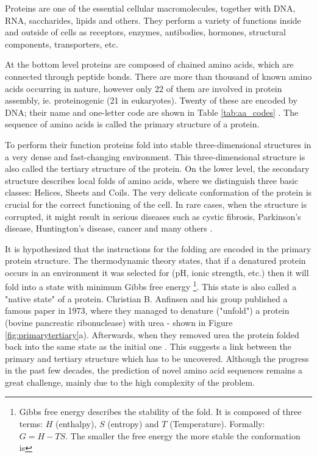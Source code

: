 Proteins are one of the essential cellular macromolecules, together with DNA, RNA, saccharides, lipids and others.
They perform a variety of functions inside and outside of cells as receptors, enzymes, antibodies, hormones, structural components, transporters, etc. 

At the bottom level proteins are composed of chained amino acids, which are connected through peptide bonds. 
There are more than thousand of known amino acids occurring in nature, however only 22 of them are involved in protein assembly, ie. proteinogenic (21 in eukaryotes). 
Twenty of these are encoded by DNA; their name and one-letter code are shown in Table \ref{tab:aa_codes} \cite{protgenaa}. 
The sequence of amino acids is called the primary structure of a protein.

To perform their function proteins fold into stable three-dimensional structures in a very dense and fast-changing environment.
This three-dimensional structure is also called the tertiary structure of the protein. 
On the lower level, the secondary structure describes local folds of amino acids, where we distinguish three basic classes: Helices, Sheets and Coils.
The very delicate conformation of the protein is crucial for the correct functioning of the cell.
In rare cases, when the structure is corrupted, it might result in serious diseases such as cystic fibrosis, Parkinson's disease, Huntington's disease, cancer and many others \cite{protein_misfolding_diseases}.

It is hypothesized that the instructions for the folding are encoded in the primary protein structure. 
The thermodynamic theory states, that if a denatured protein occurs in an environment it was selected for (pH, ionic strength, etc.) then it will fold into a state with minimum Gibbs free energy \footnote{Gibbs free energy describes the stability of the fold. It is composed of three terms: $H$ (enthalpy), $S$ (entropy) and $T$ (Temperature). Formally: $G = H - TS$. The smaller the free energy the more stable the conformation is}.
This state is also called a "native state" of a protein. 
Christian B. Anfinsen and his group published a famous paper in 1973, where they managed to denature ("unfold") a protein (bovine pancreatic ribonuclease) with urea - shown in Figure \ref{fig:primarytertiary}a). 
Afterwards, when they removed urea the protein folded back into the same state as the initial one \cite{anfinsen}. 
This suggests a link between the primary and tertiary structure which has to be uncovered. 
Although the progress in the past few decades, the prediction of novel amino acid sequences remains a great challenge, mainly due to the high complexity of the problem.

